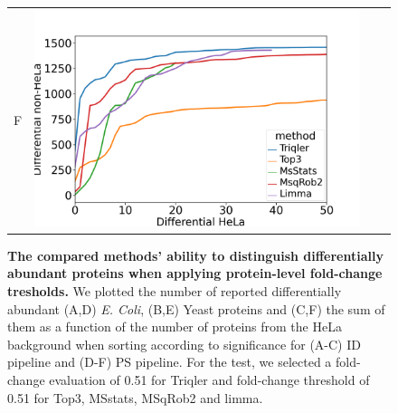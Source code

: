 \documentclass[11pt]{article}
\begin{document}
\begin{figure}[hbt]
\begin{tabular}{lclc}
        F & \includegraphics[width=0.4\linewidth]{../../result/report_plots_pipeline/diff_HeLa_vs_nonHeLa_PS_all_0.51_Limma.png} \\ 

    \end{tabular}
    \caption{{\bf The compared methods' ability to distinguish differentially abundant proteins when applying protein-level fold-change tresholds.} We plotted the number of reported differentially abundant  (A,D) {\em E. Coli}, (B,E) Yeast proteins and (C,F) the sum of them as a function of the number of proteins from the HeLa background when sorting according to significance for (A-C) ID pipeline and (D-F) PS pipeline. For the test, we selected a fold-change evaluation of 0.51 for Triqler and fold-change threshold of 0.51 for Top3, MSstats, MSqRob2 and limma. \label{fig:ability_to_differentiate_differentially_abundant_specie_vs_hela}}
\end{figure}
\end{document}
